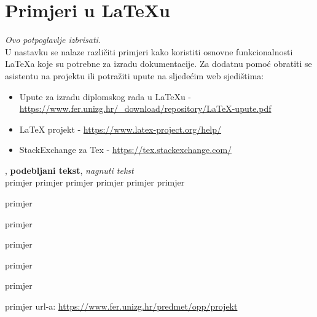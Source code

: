 		\section{Primjeri u LaTeXu}
		
		\textit{Ovo potpoglavlje izbrisati.}\\

		U nastavku se nalaze različiti primjeri kako koristiti osnovne funkcionalnosti LaTeXa koje su potrebne za izradu dokumentacije. Za dodatnu pomoć obratiti se asistentu na projektu ili potražiti upute na sljedećim web sjedištima:
		\begin{itemize}
			\item Upute za izradu diplomskog rada u LaTeXu - \url{https://www.fer.unizg.hr/_download/repository/LaTeX-upute.pdf}
			\item LaTeX projekt - \url{https://www.latex-project.org/help/}
			\item StackExchange za Tex - \url{https://tex.stackexchange.com/}\\
		
		\end{itemize} 	


		
		
		, 
		\textbf{podebljani tekst}, 
		\textit{nagnuti tekst}\\
		\normalsize primjer
		\large primjer
		\Large primjer
		\LARGE {primjer}
		\huge {primjer}
		\Huge primjer
		\normalsize
				
		\begin{packed_item}
			
			\item  primjer
			\item  primjer
			\item  primjer
			\item[] \begin{packed_enum}
				
				\item primjer
				\item primjer
			\end{packed_enum}
			
		\end{packed_item}
		
		\noindent primjer url-a: \url{https://www.fer.unizg.hr/predmet/opp/projekt}
		
